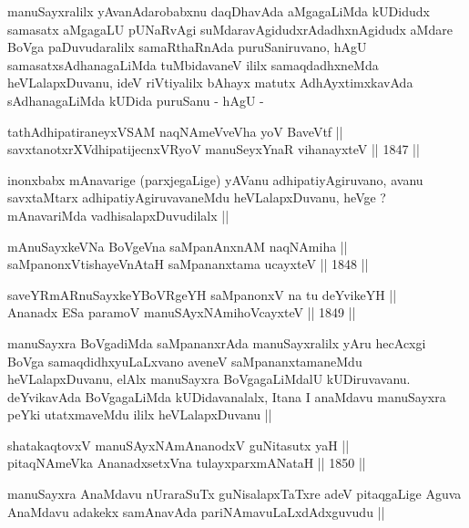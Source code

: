 \begin{artha}
manuSayxralilx yAvanAdarobabxnu daqDhavAda aMgagaLiMda kUDidudx
samasatx aMgagaLU pUNaRvAgi suMdaravAgidudxrAdadhxnAgidudx aMdare
BoVga paDuvudaralilx samaRthaRnAda puruSaniruvano, hAgU
samasatxsAdhanagaLiMda tuMbidavaneV ililx samaqdadhxneMda
heVLalapxDuvanu, ideV riVtiyalilx bAhayx matutx AdhAyxtimxkavAda
sAdhanagaLiMda kUDida puruSanu - hAgU -
\end{artha}

\begin{shl}
tathA\s dhipatiraneyxVSAM naqNAmeVveVha yoV BaveVtf || \\
savxtanotxrXV\s dhipatijecnxVRyoV manuSeyxYnaR vihanayxteV ||  1847 ||  
\end{shl}

\begin{artha}
inonxbabx mAnavarige (parxjegaLige) yAVanu adhipatiyAgiruvano, avanu
savxtaMtarx adhipatiyAgiruvavaneMdu heVLalapxDuvanu, heVge ?
mAnavariMda vadhisalapxDuvudilalx ||
\end{artha}


\begin{shl}
mAnuSayxkeVNa BoVgeVna saMpanAnxnAM naqNAmiha || \\
saMpanonxV\s tishayeVnAtaH saMpananxtama ucayxteV ||  1848 ||  
\end{shl}
				
\begin{shl}
saveYRmARnuSayxkeYBoVRgeYH saMpanonxV na tu deYvikeYH || \\
Ananadx ESa paramoV manuSAyxNAmihoVcayxteV ||  1849 ||  
\end{shl}

\begin{artha}
manuSayxra BoVgadiMda saMpananxrAda manuSayxralilx yAru hecAcxgi BoVga
samaqdidhxyuLaLxvano aveneV saMpananxtamaneMdu heVLalapxDuvanu, elAlx
manuSayxra BoVgagaLiMdalU kUDiruvavanu. deYvikavAda BoVgagaLiMda
kUDidavanalalx, Itana I anaMdavu manuSayxra peYki utatxmaveMdu ililx
heVLalapxDuvanu ||
\end{artha}

\begin{shl}
shatakaqtovxV manuSAyxNAmAnanodxV guNitasutx yaH || \\
pitaqNAmeVka AnanadxsetxVna tulayxparxmANataH ||  1850 ||  
\end{shl}

\begin{artha}
manuSayxra AnaMdavu nUraraSuTx guNisalapxTaTxre adeV pitaqgaLige Aguva
AnaMdavu adakekx samAnavAda pariNAmavuLaLxdAdxguvudu ||
\end{artha}

